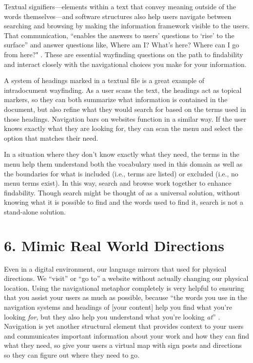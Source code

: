 \documentclass[10pt,letterpaper]{article}
\newcommand{\rulemajor}[1]{\section*{#1}}
\begin{document}
Textual signifiers---elements within a text that convey meaning outside of the
words themselves---and software structures also help users navigate between
searching and browsing by making the information framework visible to the
users. That communication, ``enables the answers to users' questions to `rise'
to the surface'' and answer questions like, Where am I? What's here? Where can I
go from here?"  \cite{Rosenfeld2015}. These are essential wayfinding questions
on the path to findability and interact closely with the navigational choices
you make for your information.

A system of headings marked in a textual file is a great example of
intradocument wayfinding.  As a user scans the text, the headings act as topical
markers, so they can both summarize what information is contained in the
document, but also refine what they would search for based on the terms used in
those headings. Navigation bars on websites function in a similar way.  If the
user knows exactly what they are looking for, they can scan the menu and select
the option that matches their need.

In a situation where they don't know exactly what they need, the terms in the
menu help them understand both the vocabulary used in this domain as well as the
boundaries for what is included (i.e., terms are listed) or excluded (i.e., no
menu terms exist). In this way, search and browse work together to enhance
findability.  Though search might be thought of as a universal solution, without
knowing what it is possible to find and the words used to find it, search is not
a stand-alone solution.

\rulemajor{6. Mimic Real World Directions}

Even in a digital environment, our language mirrors that used for physical
directions. We ``visit'' or ``go to'' a website without actually changing our
physical location. Using the navigational metaphor completely is very helpful to
ensuring that you assist your users as much as possible, because ``the words you
use in the navigation systems and headings of [your content] help you find what
you're looking \emph{for}, but they also help you understand what you're looking
\emph{at}'' \cite{Arango2018}. Navigation is yet another structural element that
provides context to your users and communicates important information about your
work and how they can find what they need, so give your users a virtual map with
sign posts and directions so they can figure out where they need to go.
\end{document}
